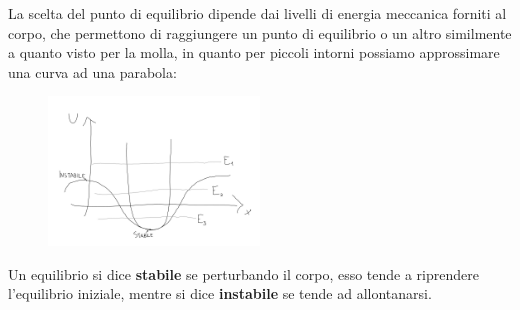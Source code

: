 \documentclass{report}
\begin{document}
La scelta del punto di equilibrio dipende dai livelli di energia meccanica forniti al corpo, che permettono di raggiungere un punto di equilibrio o un altro similmente a quanto visto per la molla, in quanto per piccoli intorni possiamo approssimare una curva ad una parabola:
\begin{figure}[H]
    \centering
    \includegraphics[width=0.5\textwidth]{EquilibriEnergiaMecc.png}
\end{figure}
Un equilibrio si dice \textbf{stabile} se perturbando il corpo, esso tende a riprendere l'equilibrio iniziale, mentre si dice \textbf{instabile} se tende ad allontanarsi. 
\end{document}
